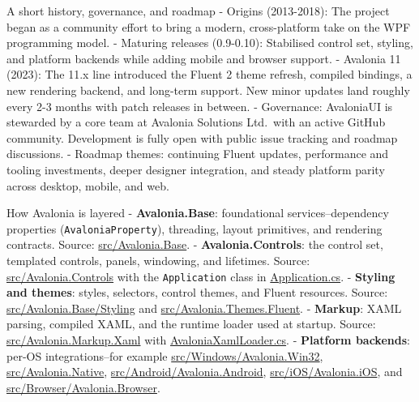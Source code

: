 A short history, governance, and roadmap - Origins (2013-2018): The
project began as a community effort to bring a modern, cross-platform
take on the WPF programming model. - Maturing releases (0.9-0.10):
Stabilised control set, styling, and platform backends while adding
mobile and browser support. - Avalonia 11 (2023): The 11.x line
introduced the Fluent 2 theme refresh, compiled bindings, a new
rendering backend, and long-term support. New minor updates land roughly
every 2-3 months with patch releases in between. - Governance:
AvaloniaUI is stewarded by a core team at Avalonia Solutions Ltd.~with
an active GitHub community. Development is fully open with public issue
tracking and roadmap discussions. - Roadmap themes: continuing Fluent
updates, performance and tooling investments, deeper designer
integration, and steady platform parity across desktop, mobile, and web.

How Avalonia is layered - \textbf{Avalonia.Base}: foundational
services--dependency properties
(\passthrough{\lstinline!AvaloniaProperty!}), threading, layout
primitives, and rendering contracts. Source:
\href{https://github.com/AvaloniaUI/Avalonia/tree/master/src/Avalonia.Base}{src/Avalonia.Base}.
- \textbf{Avalonia.Controls}: the control set, templated controls,
panels, windowing, and lifetimes. Source:
\href{https://github.com/AvaloniaUI/Avalonia/tree/master/src/Avalonia.Controls}{src/Avalonia.Controls}
with the \passthrough{\lstinline!Application!} class in
\href{https://github.com/AvaloniaUI/Avalonia/blob/master/src/Avalonia.Controls/Application.cs}{Application.cs}.
- \textbf{Styling and themes}: styles, selectors, control themes, and
Fluent resources. Source:
\href{https://github.com/AvaloniaUI/Avalonia/tree/master/src/Avalonia.Base/Styling}{src/Avalonia.Base/Styling}
and
\href{https://github.com/AvaloniaUI/Avalonia/tree/master/src/Avalonia.Themes.Fluent}{src/Avalonia.Themes.Fluent}.
- \textbf{Markup}: XAML parsing, compiled XAML, and the runtime loader
used at startup. Source:
\href{https://github.com/AvaloniaUI/Avalonia/tree/master/src/Avalonia.Markup.Xaml}{src/Avalonia.Markup.Xaml}
with
\href{https://github.com/AvaloniaUI/Avalonia/blob/master/src/Avalonia.Markup.Xaml/AvaloniaXamlLoader.cs}{AvaloniaXamlLoader.cs}.
- \textbf{Platform backends}: per-OS integrations--for example
\href{https://github.com/AvaloniaUI/Avalonia/tree/master/src/Windows/Avalonia.Win32}{src/Windows/Avalonia.Win32},
\href{https://github.com/AvaloniaUI/Avalonia/tree/master/src/Avalonia.Native}{src/Avalonia.Native},
\href{https://github.com/AvaloniaUI/Avalonia/tree/master/src/Android/Avalonia.Android}{src/Android/Avalonia.Android},
\href{https://github.com/AvaloniaUI/Avalonia/tree/master/src/iOS/Avalonia.iOS}{src/iOS/Avalonia.iOS},
and
\href{https://github.com/AvaloniaUI/Avalonia/tree/master/src/Browser/Avalonia.Browser}{src/Browser/Avalonia.Browser}.

